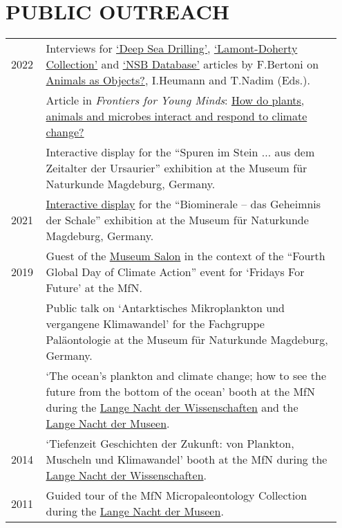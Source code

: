 \documentclass[11pt, a4paper]{article}
\begin{document}
\section{PUBLIC OUTREACH}
\begin{longtable}{@{}p{0.1\linewidth} P{0.85\linewidth}@{}}
2022 & Interviews for \href{https://animalsasobjects.org/story.deep-sea-drilling/}{`Deep Sea Drilling'}, \href{https://animalsasobjects.org/material.lamont-doherty-collection/}{`Lamont-Doherty Collection'} and \href{https://animalsasobjects.org/material.nsb-database/}{`NSB Database'} articles by F.Bertoni on \href{https://animalsasobjects.org}{Animals as Objects?}, I.Heumann and T.Nadim (Eds.).\\
& Article in \textit{Frontiers for Young Minds}: \href{http://doi.org/10.3389/frym.2022.703195}{How do plants, animals and microbes interact and respond to climate change?}\\
& Interactive display for the ``Spuren im Stein ... aus dem Zeitalter der Ursaurier'' exhibition at the Museum f\"{u}r Naturkunde Magdeburg, Germany.\\
2021 & \href{https://github.com/plannapus/raup_model}{Interactive display} for the ``Biominerale -- das Geheimnis der Schale'' exhibition at the Museum f\"{u}r Naturkunde Magdeburg, Germany.\\
2019 & Guest of the \href{https://www.museumfuernaturkunde.berlin/de/museum/veranstaltungen/aktionstag-zum-globalen-klimastreik-0}{Museum Salon} in the context of the ``Fourth Global Day of Climate Action'' event for `Fridays For Future' at the MfN.\\
 & Public talk on `Antarktisches Mikroplankton und vergangene Klimawandel' for the Fachgruppe Pal\"{a}ontologie at the Museum f\"{u}r Naturkunde Magdeburg, Germany.\\
 & `The ocean’s plankton and climate change; how to see the future from the bottom of the ocean' booth at the MfN during the \href{http://www.langenachtderwissenschaften.de/}{Lange Nacht der Wissenschaften} and the \href{http://www.lange-nacht-der-museen.de/}{Lange Nacht der Museen}.\\
2014 & `Tiefenzeit Geschichten der Zukunft: von Plankton, Muscheln und Klimawandel' booth at the MfN during the \href{http://www.langenachtderwissenschaften.de/}{Lange Nacht der Wissenschaften}.\\
2011 & Guided tour of the MfN Micropaleontology Collection during the \href{http://www.lange-nacht-der-museen.de/}{Lange Nacht der Museen}.\\
\end{longtable}
\end{document}
